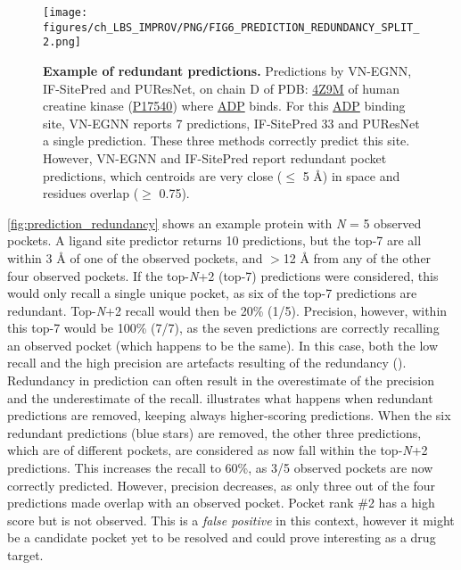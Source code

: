 \begin{figure}[htb!]
    \centering
    \texttt{[image: figures/ch\_LBS\_IMPROV/PNG/FIG6\_PREDICTION\_REDUNDANCY\_SPLIT\_2.png]}
    \caption[Example of redundant predictions]{\textbf{Example of redundant predictions.} Predictions by VN-EGNN, IF-SitePred and PUResNet, on chain D of PDB: \href{https://www.ebi.ac.uk/pdbe/entry/pdb/4z9m}{4Z9M} \cite{PDB_4Z9M} of human creatine kinase (\href{https://www.uniprot.org/uniprotkb/P17540/entry}{P17540}) where \href{https://www.ebi.ac.uk/pdbe-srv/pdbechem/chemicalCompound/show/ADP}{ADP} binds. For this \href{https://www.ebi.ac.uk/pdbe-srv/pdbechem/chemicalCompound/show/ADP}{ADP} binding site, VN-EGNN reports 7 predictions, IF-SitePred 33 and PUResNet a single prediction. These three methods correctly predict this site. However, VN-EGNN and IF-SitePred report redundant pocket predictions, which centroids are very close ($\leq$ 5 \AA{}) in space and residues overlap ($\geq$ 0.75).}
    \label{fig:prediction_redundancy_examples}
\end{figure}

\autoref{fig:prediction_redundancy} shows an example protein with \textit{N} = 5 observed pockets. A ligand site predictor returns 10 predictions, but the top-7 are all within 3 \AA{} of one of the observed pockets, and $>$12 \AA{} from any of the other four observed pockets. If the top-\textit{N}+2 (top-7) predictions were considered, this would only recall a single unique pocket, as six of the top-7 predictions are redundant. Top-\textit{N}+2 recall would then be 20\% (1/5). Precision, however, within this top-7 would be 100\% (7/7), as the seven predictions are correctly recalling an observed pocket (which happens to be the same). In this case, both the low recall and the high precision are artefacts resulting of the redundancy (). Redundancy in prediction can often result in the overestimate of the precision and the underestimate of the recall.  illustrates what happens when redundant predictions are removed, keeping always higher-scoring predictions. When the six redundant predictions (blue stars) are removed, the other three predictions, which are of different pockets, are considered as now fall within the top-\textit{N}+2 predictions. This increases the recall to 60\%, as 3/5 observed pockets are now correctly predicted. However, precision decreases, as only three out of the four predictions made overlap with an observed pocket. Pocket rank \#2 has a high score but is not observed. This is a \textit{false positive} in this context, however it might be a candidate pocket yet to be resolved and could prove interesting as a drug target.

